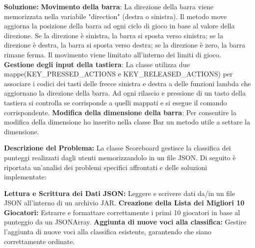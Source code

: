 \documentclass[a4paper,12pt]{report}
\begin{document}
{\textbf{Soluzione:}}
\newline \textbf{Movimento della barra}: La direzione della barra viene memorizzata nella variabile "direction" (destra o sinistra). Il metodo move aggiorna la posizione della barra ad ogni ciclo di gioco in base al valore della direzione. Se la direzione è sinistra, la barra si sposta verso sinistra; se la direzione è destra, la barra si sposta verso destra; se la direzione è zero, la barra rimane ferma. Il movimento viene limitato all'interno dei limiti di gioco.
\newline \textbf{Gestione degli input della tastiera}: La classe utilizza due mappe\newline (KEY\_PRESSED\_ACTIONS e KEY\_RELEASED\_ACTIONS) per associare i codici dei tasti delle frecce sinistra e destra a delle funzioni lambda che aggiornano la direzione della barra. Ad ogni rilascio e pressione di un tasto della tastiera si controlla se corrisponde a quelli mappati e si esegue il comando corrispondente.
\newline \textbf{Modifica della dimensione della barra}: Per consentire la modifica della dimensione ho inserito nella classe Bar un metodo utile a settare la dimensione.


\textbf{Descrizione del Problema:} La classe Scoreboard gestisce la classifica dei punteggi realizzati dagli utenti memorizzandolo in un file JSON. Di seguito è riportata un'analisi dei problemi specifici affrontati e delle soluzioni implementate:


\textbf{Lettura e Scrittura dei Dati JSON:} Leggere e scrivere dati da/in un file JSON all'interno di un archivio JAR.
\newline \textbf{Creazione della Lista dei Migliori 10 Giocatori:} Estrarre e formattare correttamente i primi 10 giocatori in base al punteggio da un JSONArray.
\newline \textbf{Aggiunta di nuove voci alla classifica:} Gestire l'aggiunta di nuove voci alla classifica esistente, garantendo che siano correttamente ordinate.
\end{document}
